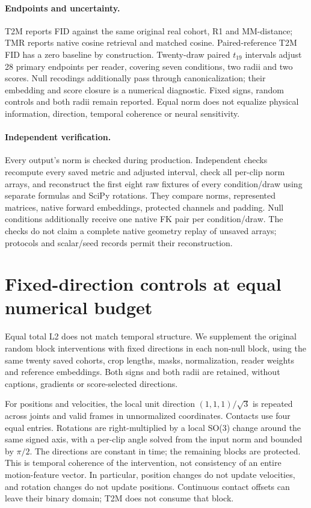 \documentclass[10pt,twocolumn,letterpaper]{article}
\begin{document}

\paragraph{Endpoints and uncertainty.}
T2M reports FID against the same original real cohort, R1 and MM-distance; TMR reports native cosine retrieval and matched cosine. Paired-reference T2M FID has a zero baseline by construction. Twenty-draw paired $t_{19}$ intervals adjust 28 primary endpoints per reader, covering seven conditions, two radii and two scores. Null recodings additionally pass through canonicalization; their embedding and score closure is a numerical diagnostic. Fixed signs, random controls and both radii remain reported. Equal norm does not equalize physical information, direction, temporal coherence or neural sensitivity.

\paragraph{Independent verification.}
Every output's norm is checked during production. Independent checks recompute every saved metric and adjusted interval, check all per-clip norm arrays, and reconstruct the first eight raw fixtures of every condition/draw using separate formulas and SciPy rotations. They compare norms, represented matrices, native forward embeddings, protected channels and padding. Null conditions additionally receive one native FK pair per condition/draw. The checks do not claim a complete native geometry replay of unsaved arrays; protocols and scalar/seed records permit their reconstruction.


\section{Fixed-direction controls at equal numerical budget}
Equal total L2 does not match temporal structure. We supplement the original random block interventions with fixed directions in each non-null block, using the same twenty saved cohorts, crop lengths, masks, normalization, reader weights and reference embeddings. Both signs and both radii are retained, without captions, gradients or score-selected directions.

For positions and velocities, the local unit direction $(1,1,1)/\sqrt3$ is repeated across joints and valid frames in unnormalized coordinates. Contacts use four equal entries. Rotations are right-multiplied by a local SO(3) change around the same signed axis, with a per-clip angle solved from the input norm and bounded by $\pi/2$. The directions are constant in time; the remaining blocks are protected. This is temporal coherence of the intervention, not consistency of an entire motion-feature vector. In particular, position changes do not update velocities, and rotation changes do not update positions. Continuous contact offsets can leave their binary domain; T2M does not consume that block.
\end{document}
